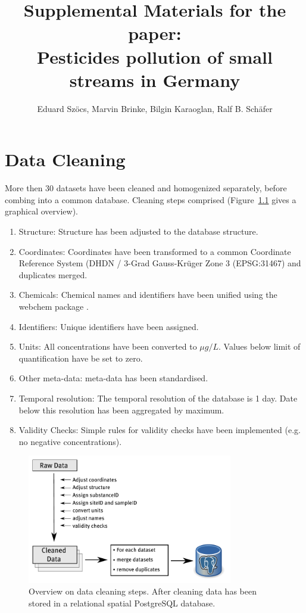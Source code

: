 \documentclass[pdftex,a4paper]{scrreprt}
\title{Supplemental Materials for the paper: \\Pesticides pollution of small streams in
Germany}
\author{Eduard Szöcs, Marvin Brinke, Bilgin Karaoglan, Ralf B. Schäfer}
\begin{document}
\maketitle

\tableofcontents
\listoffigures
\listoftables



\chapter{Data Cleaning}
More then 30 datasets have been cleaned and homogenized separately, before combing into a common database.
Cleaning steps comprised (Figure~\ref{fig:data_cleaning} gives a graphical overview).

\begin{enumerate}
	\item Structure: Structure has been adjusted to the database structure.
	\item Coordinates: Coordinates have been transformed to a common Coordinate Reference System (DHDN / 3-Grad Gauss-Krüger Zone 3 (EPSG:31467) and duplicates merged.
	\item Chemicals: Chemical names and identifiers have been unified using the webchem package \citep{szocs_webchem:_2016}.
	\item  Identifiers: Unique identifiers have been assigned.
	\item Units: All concentrations have been converted to $\mu g/L$. Values below limit of quantification have be set to zero.
	\item Other meta-data: meta-data has been standardised.
	\item Temporal resolution: The temporal resolution of the database is 1 day. Date below this resolution has been aggregated by maximum.
	\item Validity Checks: Simple rules for validity checks have been implemented (e.g. no negative concentrations).
\end{enumerate}

\begin{figure}[h]
	\centering
	\includegraphics[width = 0.8\textwidth]{data_cleaning}
	\caption[Overview on data cleaning steps.]{Overview on data cleaning steps. After cleaning data has been stored in a relational spatial PostgreSQL database.}
	\label{fig:data_cleaning}
\end{figure}
\end{document}
